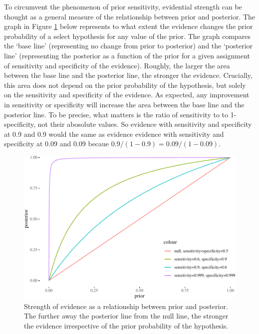 \documentclass[10pt,dvipsnames,enabledeprecatedfontcommands]{scrartcl}
\begin{document}
To circumvent the phenomenon of prior sensitivity, evidential strength
can be thought as a general measure of the relationship between prior
and posterior. The graph in Figure \ref{fig:strength-prior-post} below
represents to what extent the evidence changes the prior probability of
a select hypothesis for any value of the prior. The graph compares the
`base line' (representing no change from prior to posterior) and the
`posterior line' (representing the posterior as a function of the prior
for a given assignment of sensitivity and specificity of the evidence).
Roughly, the larger the area between the base line and the posterior
line, the stronger the evidence. Crucially, this area does not depend on
the prior probability of the hypothesis, but solely on the sensitivity
and specificity of the evidence. As expected, any improvement in
sensitivity or specificity will increase the area between the base line
and the posterior line. To be precise, what matters is the ratio of
sensitivity to to 1-specificity, not their abosolute values. So evidence
with sensitivity and specificity at 0.9 and 0.9 would the same as
evidence evidence with sensitivity and specificity at 0.09 and 0.09
becaue \(0.9/(1-0.9) = 0.09/(1-0.09)\).

\begin{figure}


\begin{center}\includegraphics[width=0.9\linewidth]{conjunction-paradox_files/figure-latex/unnamed-chunk-12-1} \end{center}

\caption{Strength of evidence as a relationship between prior and posterior. 
The further away the posterior line from the null line, the stronger the evidence irrespective 
of the prior probability of the hypothesis.}
\label{fig:strength-prior-post}
\end{figure}
\end{document}
